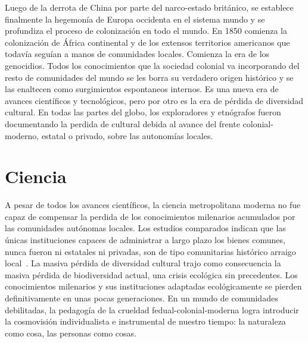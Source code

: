 \documentclass[a4paper,10pt]{book}
\begin{document}

Luego de la derrota de China por parte del narco-estado británico, se establece finalmente la hegemonía de Europa occidenta en el sistema mundo y se profundiza el proceso de colonización en todo el mundo. %
En 1850 comienza la colonización de África continental y de los extensos territorios americanos que todavía seguían a manos de comunidades locales.
Comienza la era de los genocidios.
Todos los conocimientos que la sociedad colonial va incorporando del resto de comunidades del mundo se les borra su verdadero origen histórico y se las enaltecen como surgimientos espontaneos internos.
Es una nueva era de avances científicos y tecnológicos, pero por otro es la era de pérdida de diversidad cultural.
En todas las partes del globo, los exploradores y etnógrafos fueron documentando la perdida de cultural debida al avance del frente colonial-moderno, estatal o privado, sobre las autonomías locales.

\section{Ciencia}

A pesar de todos los avances científicos, la ciencia metropolitana moderna no fue capaz de compensar la perdida de los conocimientos milenarios acumulados por las comunidades autónomas locales.
Los estudios comparados indican que las únicas instituciones capaces de administrar a largo plazo los bienes comunes, nunca fueron ni estatales ni privadas, son de tipo comunitarias histórico arraigo local~\cite{ostrom2009,ostrom1990}.
La masiva pérdida de diversidad cultural trajo como consecuencia la masiva pérdida de biodiversidad actual, una crisis ecológica sin precedentes.
Los conocimientos milenarios y sus instituciones adaptadas ecológicamente se pierden definitivamente en unas pocas generaciones.
En un mundo de comunidades debilitadas, la pedagogía de la crueldad fedual-colonial-moderna logra introducir la cosmovisión individualista e instrumental de nuestro tiempo: la naturaleza como cosa, las personas como cosas.
\end{document}
